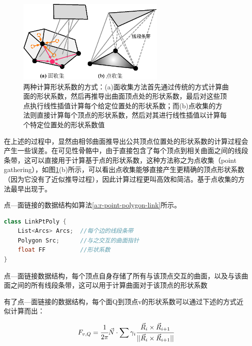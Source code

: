 \begin{figure}
	\sidecaption
	\includegraphics[width=0.65\textwidth]{figures/r/point-gathering}
	\caption{两种计算形状系数的方式：(a)面收集方法首先通过传统的方式计算曲面的形状系数，然后再推导出曲面顶点处的形状系数，最后对这些顶点执行线性插值计算每个给定位置处的形状系数；而(b)点收集的方法则直接计算每个顶点的形状系数，然后对其进行线性插值以计算每个特定位置处的形状系数值}
	\label{f:r-point-gathering}
\end{figure}

在上述的过程中，显然由相邻曲面推导出公共顶点位置处的形状系数的计算过程会产生一些误差。在可见性骨骼中，由于直接包含了每个顶点到相关曲面之间的线段条带，这可以直接用于计算基于点的形状系数，这种方法称之为点收集（point gathering），如图\ref{f:r-point-gathering}(b)所示，可以看出点收集能够直接产生更精确的顶点形状系数（因为它没有了近似推导过程），因此计算过程更叫高效和简洁。基于点收集的方法最早出现于\cite{a:Araytracingalgorithmforprogressiveradiosity}。

点—面链接的数据结构如算法\ref{a:r-point-polygon-link}所示。

\begin{algorithm}
\begin{lstlisting}[language=C++, mathescape]
class LinkPtPoly {
	List<Arcs> Arcs;  //每个边的线段条带
	Polygon Src;      //与之交互的曲面指针
	float FF          //形状系数
}
\end{lstlisting}
\caption{点—面链接数据结构，每个顶点自身存储了所有与该顶点交互的曲面，以及与该曲面之间的所有线段条带，这可以用于计算曲面对于该顶点的形状系数}
\label{a:r-point-polygon-link}
\end{algorithm}

有了点—面链接的数据结构，每个面Q到顶点v的形状系数可以通过下述的方式近似计算而出：

\begin{equation}
	F_{v,Q}= \cfrac{1}{2\pi}\vec{N}\cdot\sum\gamma_i \cfrac{\vec{R}_i\times\vec{R}_{i+1}}{||\vec{R}_i\times\vec{R}_{i+1}||}
\end{equation}

